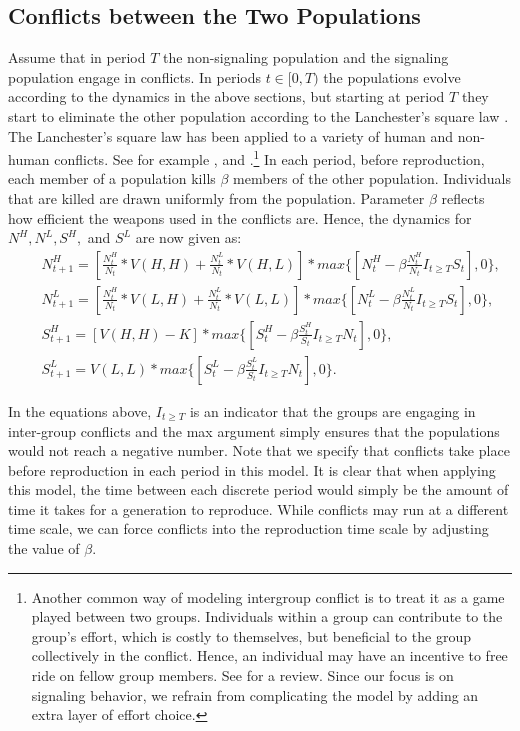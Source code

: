 \subsection{Conflicts between the Two Populations}

Assume that in period $T$ the non-signaling population and the signaling population engage in conflicts. In periods $t \in [0,T)$ the populations evolve according to the dynamics in the above sections, but starting at period $T$ they start to eliminate the other population according to the Lanchester's square law \citep{Lanchester1916}. The Lanchester's square law has been applied to a variety of human and non-human conflicts. See for example \cite{Wilsonetal2002}, \cite{JohnsonMackay2015EHB} and \cite{clifton2020brief}.\footnote{Another common way of modeling intergroup conflict is to treat it as a game played between two groups. Individuals within a group can contribute to the group's effort, which is costly to themselves, but beneficial to the group collectively in the conflict. Hence, an individual may have an incentive to free ride on fellow group members. See \cite{Bornstein2003} for a review. Since our focus is on signaling behavior, we refrain from complicating the model by adding an extra layer of effort choice.} In each period, before reproduction, each member of a population kills $\beta$ members of the other population. Individuals that are killed are drawn uniformly from the population. Parameter $\beta$ reflects how efficient the weapons used in the conflicts are. Hence, the dynamics for $N^H, N^L, S^H,$ and $S^L$ are now given as:
\begin{eqnarray}
    && N^H_{t+1}=[\frac{N^H_t}{N_t}*V(H,H)+\frac{N^L_t}{N_t}*V(H,L)]*max\{[N^H_t-\beta \frac{N^H_t}{N_t} I_{t \geq T}S_t],0\},
\\
&& N^L_{t+1}=[\frac{N^H_t}{N_t}*V(L,H)+\frac{N^L_t}{N_t}*V(L,L)]*max\{[N^L_t-\beta \frac{N^L_t}{N_t} I_{t \geq T}S_t],0\},
\\
    && S^H_{t+1}=[V(H,H)-K]*max\{[S^H_t-\beta \frac{S^H_t}{S_t} I_{t \geq T}N_t],0\},
\\
  && S^L_{t+1}=V(L,L)*max\{[S^L_t-\beta \frac{S^L_t}{S_t} I_{t \geq T}N_t],0\}.
\end{eqnarray}

In the equations above, $I_{t \geq T}$ is an indicator that the groups are engaging in inter-group conflicts and the max argument simply ensures that the populations would not reach a negative number. Note that we specify that conflicts take place before reproduction in each period in this model. It is clear that when applying this model, the time between each discrete period would simply be the amount of time it takes for a generation to reproduce. While conflicts may run at a different time scale, we can force conflicts into the reproduction time scale by adjusting the value of $\beta$. 

